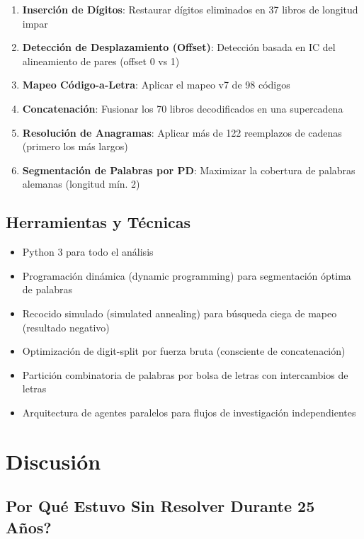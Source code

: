 \documentclass[11pt,a4paper]{article}
\begin{document}
\begin{enumerate}
\item \textbf{Inserci\'{o}n de D\'{i}gitos}: Restaurar d\'{i}gitos eliminados en 37 libros de longitud impar
\item \textbf{Detecci\'{o}n de Desplazamiento (Offset)}: Detecci\'{o}n basada en IC del alineamiento de pares (offset 0 vs 1)
\item \textbf{Mapeo C\'{o}digo-a-Letra}: Aplicar el mapeo v7 de 98 c\'{o}digos
\item \textbf{Concatenaci\'{o}n}: Fusionar los 70 libros decodificados en una supercadena
\item \textbf{Resoluci\'{o}n de Anagramas}: Aplicar m\'{a}s de 122 reemplazos de cadenas (primero los m\'{a}s largos)
\item \textbf{Segmentaci\'{o}n de Palabras por PD}: Maximizar la cobertura de palabras alemanas (longitud m\'{i}n. 2)
\end{enumerate}

\subsection{Herramientas y T\'{e}cnicas}

\begin{itemize}
\item Python 3 para todo el an\'{a}lisis
\item Programaci\'{o}n din\'{a}mica (dynamic programming) para segmentaci\'{o}n \'{o}ptima de palabras
\item Recocido simulado (simulated annealing) para b\'{u}squeda ciega de mapeo (resultado negativo)
\item Optimizaci\'{o}n de digit-split por fuerza bruta (consciente de concatenaci\'{o}n)
\item Partici\'{o}n combinatoria de palabras por bolsa de letras con intercambios de letras
\item Arquitectura de agentes paralelos para flujos de investigaci\'{o}n independientes
\end{itemize}

\section{Discusi\'{o}n}

\subsection{\textquestiondown Por Qu\'{e} Estuvo Sin Resolver Durante 25 A\~{n}os?}
\end{document}
